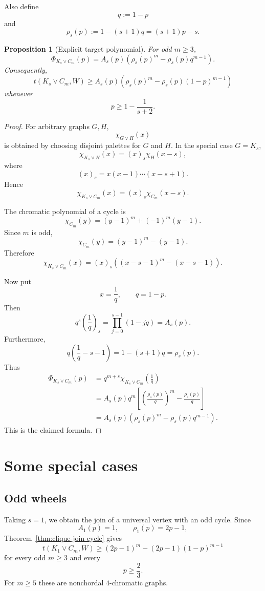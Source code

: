 \documentclass[11pt]{article}
\newtheorem{proposition}[theorem]{Proposition}
\newcommand{\1}{\mathbf{1}}
\newcommand{\join}{\vee}
\begin{document}
Also define
\[
q:=1-p
\]
and
\[
\rho_s(p)
:=
1-(s+1)q
=
(s+1)p-s.
\]

\begin{proposition}[Explicit target polynomial]
\label{prop:explicit}
For odd $m\ge3$,
\[
\boxed{
\Phi_{K_s\join C_m}(p)
=
A_s(p)
\left(
\rho_s(p)^m
-
\rho_s(p)q^{m-1}
\right).
}
\]
Consequently,
\[
\boxed{
t(K_s\join C_m,W)
\ge
A_s(p)
\left(
\rho_s(p)^m
-
\rho_s(p)(1-p)^{m-1}
\right)
}
\]
whenever
\[
p\ge1-\frac1{s+2}.
\]
\end{proposition}

\begin{proof}
For arbitrary graphs $G,H$,
\[
\chi_{G\join H}(x)
\]
is obtained by choosing disjoint palettes for $G$ and $H$.
In the special case $G=K_s$,
\[
\chi_{K_s\join H}(x)
=
(x)_s\chi_H(x-s),
\]
where
\[
(x)_s=x(x-1)\cdots(x-s+1).
\]
Hence
\[
\chi_{K_s\join C_m}(x)
=
(x)_s\chi_{C_m}(x-s).
\]

The chromatic polynomial of a cycle is
\[
\chi_{C_m}(y)
=
(y-1)^m+(-1)^m(y-1).
\]
Since $m$ is odd,
\[
\chi_{C_m}(y)
=
(y-1)^m-(y-1).
\]
Therefore
\[
\chi_{K_s\join C_m}(x)
=
(x)_s
\left(
(x-s-1)^m-(x-s-1)
\right).
\]

Now put
\[
x=\frac1q,
\qquad
q=1-p.
\]
Then
\[
q^s\left(\frac1q\right)_s
=
\prod_{j=0}^{s-1}(1-jq)
=
A_s(p).
\]
Furthermore,
\[
q\left(\frac1q-s-1\right)
=
1-(s+1)q
=
\rho_s(p).
\]
Thus
\begin{align*}
\Phi_{K_s\join C_m}(p)
&=
q^{m+s}
\chi_{K_s\join C_m}\!\left(\frac1q\right)
\\
&=
A_s(p)
q^m
\left[
\left(\frac{\rho_s(p)}q\right)^m
-
\frac{\rho_s(p)}q
\right]
\\
&=
A_s(p)
\left(
\rho_s(p)^m
-
\rho_s(p)q^{m-1}
\right).
\end{align*}
This is the claimed formula.
\end{proof}


\section{Some special cases}

\subsection{Odd wheels}

Taking $s=1$, we obtain the join of a universal vertex with an odd
cycle.  Since
\[
A_1(p)=1,
\qquad
\rho_1(p)=2p-1,
\]
Theorem~\ref{thm:clique-join-cycle} gives
\[
t(K_1\join C_m,W)
\ge
(2p-1)^m
-
(2p-1)(1-p)^{m-1}
\]
for every odd $m\ge3$ and every
\[
p\ge\frac23.
\]
For $m\ge5$ these are nonchordal $4$-chromatic graphs.
\end{document}
